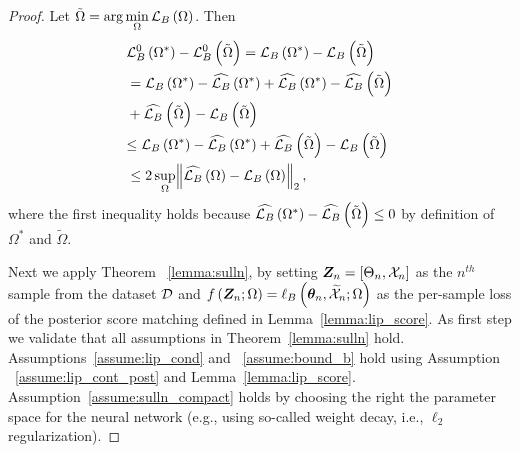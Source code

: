 \begin{proof}
{Let $\tilde{\Omega}=\arg\min\limits_{\Omega}{{\mathcal{L}}_{B}}\left(\Omega\right)$. Then}
    \begin{align}
        &{\mathcal{L}_{B}^{0}}\left(\Omega^*\right)-{\mathcal{L}_{B}^{0}}\left(\tilde{\Omega}\right)={{\mathcal{L}}_{B}}\left(\Omega^*\right)-{{\mathcal{L}}_{B}}\left(\tilde{\Omega}\right)\nonumber\\
        &={{\mathcal{L}}_{B}}\left(\Omega^*\right)-\widehat{\mathcal{L}_{B}}\left(\Omega^*\right)+\widehat{\mathcal{L}_{B}}\left(\Omega^*\right)-\widehat{\mathcal{L}_{B}}\left(\tilde{\Omega}\right) \nonumber\\
        &+\widehat{\mathcal{L}_{B}}\left(\tilde{\Omega}\right)-{{\mathcal{L}}_{B}}\left(\tilde{\Omega}\right)\nonumber\\
        &{\leq
        {{\mathcal{L}}_{B}}\left(\Omega^*\right)-\widehat{\mathcal{L}_{B}}\left(\Omega^*\right)
        +\widehat{\mathcal{L}_{B}}\left(\tilde{\Omega}\right)-{{\mathcal{L}}_{B}}\left(\tilde{\Omega}\right)}\nonumber\\
        &\leq 
        2\sup\limits_{\Omega}\norm{\widehat{\mathcal{L}_{B}}\left(\Omega\right)-{{\mathcal{L}}_{B}}\left(\Omega\right)}_2,
    \end{align}
    where {the first inequality holds because %
    }
    $\widehat{\mathcal{L}_{B}}\left(\Omega^*\right)-\widehat{\mathcal{L}_{B}}\left(\tilde{\Omega}\right)\leq0$ by definition of $\Omega^*$ and $\tilde{\Omega}$.
    
    {Next we %
    apply Theorem ~\ref{lemma:sulln}, by setting 
    {$\Z_n=[\pr_n,\xset_n]$ as the $n^{th}$ sample from the dataset $\mathcal{D}$ and}
    $f\brackets{\Z_n;\Omega}= {\ell_B\brackets{\p_n,\xsetr_n;\Omega}} $ as the per-sample loss of the posterior score matching {defined in Lemma~\ref{lemma:lip_score}.  
    }
    As first step we validate that all assumptions in Theorem~\ref{lemma:sulln} hold. Assumptions~\ref{assume:lip_cond} and ~\ref{assume:bound_b} hold using Assumption ~\ref{assume:lip_cont_post} and Lemma~\ref{lemma:lip_score}. Assumption~\ref{assume:sulln_compact} holds by choosing the right the parameter space for the neural network (e.g., using {so-called} weight decay{, i.e., $\ell_2$ regularization}).}


\end{proof}
